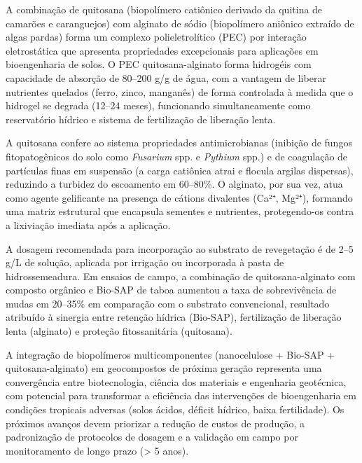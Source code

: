 \documentclass[
  portuguese,
  11pt,
  a4paper,
  open=any]{scrbook}
\begin{document}
A combinação de quitosana (biopolímero catiônico derivado da quitina de
camarões e caranguejos) com alginato de sódio (biopolímero aniônico
extraído de algas pardas) forma um complexo polieletrolítico (PEC) por
interação eletrostática que apresenta propriedades excepcionais para
aplicações em bioengenharia de solos. O PEC quitosana-alginato forma
hidrogéis com capacidade de absorção de 80--200 g/g de água, com a
vantagem de liberar nutrientes quelados (ferro, zinco, manganês) de
forma controlada à medida que o hidrogel se degrada (12--24 meses),
funcionando simultaneamente como reservatório hídrico e sistema de
fertilização de liberação lenta.

A quitosana confere ao sistema propriedades antimicrobianas (inibição de
fungos fitopatogênicos do solo como \emph{Fusarium} spp. e
\emph{Pythium} spp.) e de coagulação de partículas finas em suspensão (a
carga catiônica atrai e flocula argilas dispersas), reduzindo a turbidez
do escoamento em 60--80\%. O alginato, por sua vez, atua como agente
gelificante na presença de cátions divalentes (Ca²⁺, Mg²⁺), formando uma
matriz estrutural que encapsula sementes e nutrientes, protegendo-os
contra a lixiviação imediata após a aplicação.

A dosagem recomendada para incorporação ao substrato de revegetação é de
2--5 g/L de solução, aplicada por irrigação ou incorporada à pasta de
hidrossemeadura. Em ensaios de campo, a combinação de quitosana-alginato
com composto orgânico e Bio-SAP de taboa aumentou a taxa de
sobrevivência de mudas em 20--35\% em comparação com o substrato
convencional, resultado atribuído à sinergia entre retenção hídrica
(Bio-SAP), fertilização de liberação lenta (alginato) e proteção
fitossanitária (quitosana).

\begin{tcolorbox}[enhanced jigsaw, leftrule=.75mm, colframe=quarto-callout-note-color-frame, colback=white, bottomrule=.15mm, opacityback=0, colbacktitle=quarto-callout-note-color!10!white, breakable, bottomtitle=1mm, opacitybacktitle=0.6, title=\textcolor{quarto-callout-note-color}{\faInfo}\hspace{0.5em}{Perspectiva}, titlerule=0mm, toprule=.15mm, toptitle=1mm, rightrule=.15mm, left=2mm, arc=.35mm, coltitle=black]

A integração de biopolímeros multicomponentes (nanocelulose + Bio-SAP +
quitosana-alginato) em geocompostos de próxima geração representa uma
convergência entre biotecnologia, ciência dos materiais e engenharia
geotécnica, com potencial para transformar a eficiência das intervenções
de bioengenharia em condições tropicais adversas (solos ácidos, déficit
hídrico, baixa fertilidade). Os próximos avanços devem priorizar a
redução de custos de produção, a padronização de protocolos de dosagem e
a validação em campo por monitoramento de longo prazo (\textgreater{} 5
anos).

\end{tcolorbox}
\end{document}
